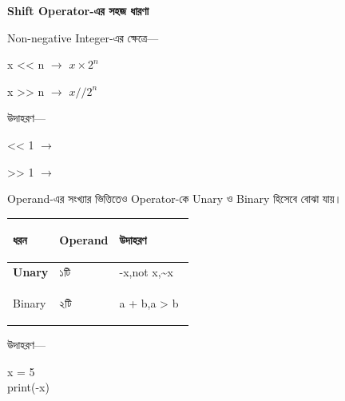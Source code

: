 \begin{rememberbox}

\textbf{\color{deepOrange}Shift Operator-এর সহজ ধারণা}

Non-negative Integer-এর ক্ষেত্রে—

\begin{center}

\textenglish{\ttfamily x << n}
\(\longrightarrow\)
\(x \times 2^n\)

\qquad

\textenglish{\ttfamily x >> n}
\(\longrightarrow\)
\(x // 2^n\)

\end{center}

উদাহরণ—

\begin{center}

\textenglish{ << 1}
\(\longrightarrow\)
\textenglish{}

\qquad

\textenglish{ >> 1}
\(\longrightarrow\)
\textenglish{}

\end{center}

\end{rememberbox}



Operand-এর সংখ্যার ভিত্তিতেও Operator-কে Unary ও Binary
হিসেবে বোঝা যায়।

\begin{tabularx}
{\linewidth}
{
|>{\bfseries\RaggedRight\arraybackslash}p{0.25\linewidth}
|>{\centering\arraybackslash}p{0.20\linewidth}
|Y|
}

\hline
{}

\textbf{ধরন}
&
\textbf{Operand}
&
\textbf{উদাহরণ}
\\
\hline

Unary
&
১টি
&
\textenglish{\ttfamily -x,\quad not x,\quad \textasciitilde x}
\\
\hline

Binary
&
২টি
&
\textenglish{\ttfamily a + b,\quad a > b}
\\
\hline

\end{tabularx}

উদাহরণ—

\begin{codebox}
\begin{english}
\ttfamily
x = 5\\
print(-x)
\end{english}
\end{codebox}

